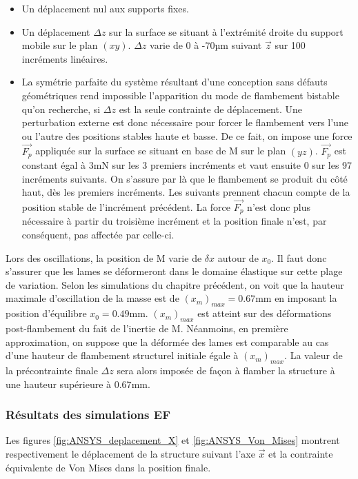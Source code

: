 \begin{itemize}[label=$\circ$]
\item Un déplacement nul aux supports fixes.
\item Un déplacement $\Delta z$ sur la surface se situant à l'extrémité droite du support mobile sur le plan $(xy)$. $\Delta z$ varie de 0 à -70µm suivant $\vec{z}$ sur 100 incréments linéaires.
\item La symétrie parfaite du système résultant d'une conception sans défauts géométriques rend impossible l'apparition du mode de flambement bistable qu'on recherche, si $\Delta z$ est la seule contrainte de déplacement. Une perturbation externe est donc nécessaire pour forcer le flambement vers l'une ou l'autre des positions stables haute et basse. De ce fait, on impose une force $\vec{F_p}$ appliquée sur la surface se situant en base de M sur le plan $(yz)$. $\vec{F_p}$ est constant égal à 3mN sur les 3 premiers incréments et vaut ensuite 0 sur les 97 incréments suivants. On s'assure par là que le flambement se produit du côté haut, dès les premiers incréments. Les suivants prennent chacun compte de la position stable de l'incrément précédent. La force $\vec{F_p}$ n'est donc plus nécessaire à partir du troisième incrément et la position finale n'est, par conséquent, pas affectée par celle-ci.
\end{itemize}

Lors des oscillations, la position de M varie de $\delta x$ autour de $x_0$. Il faut donc s'assurer que les lames se déformeront dans le domaine élastique sur cette plage de variation. Selon les simulations du chapitre précédent, on voit que la hauteur maximale d'oscillation de la masse est de $(x_m)_{max}=0.67$mm en imposant la position d'équilibre $x_0=0.49$mm. $(x_m)_{max}$ est atteint sur des déformations post-flambement du fait de l'inertie de M. Néanmoins, en première approximation, on suppose que la déformée des lames est comparable au cas d'une hauteur de flambement structurel initiale égale à $(x_m)_{max}$. La valeur de la précontrainte finale $\Delta z$ sera alors imposée de façon à flamber la structure à une hauteur supérieure à $0.67$mm.
		\subsubsection{Résultats des simulations EF} 
Les figures \ref{fig:ANSYS_deplacement_X} et \ref{fig:ANSYS_Von_Mises} montrent respectivement le déplacement de la structure suivant l'axe $\vec{x}$ et la contrainte équivalente de Von Mises dans la position finale.


